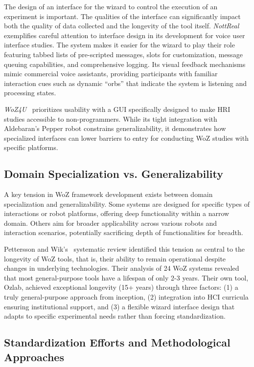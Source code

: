 \documentclass[letterpaper, 10 pt, conference]{subfiles/ieeeconf}
\begin{document}
The design of an interface for the wizard to control the execution of an experiment is important. The qualities of the interface can significantly impact both the quality of data collected and the longevity of the tool itself. \emph{NottReal}~\cite{Porcheron2020} exemplifies careful attention to interface design in its development for voice user interface studies. The system makes it easier for the wizard to play their role featuring tabbed lists of pre-scripted messages, slots for customization, message queuing capabilities, and comprehensive logging. Its visual feedback mechanisms mimic commercial voice assistants, providing participants with familiar interaction cues such as dynamic ``orbs'' that indicate the system is listening and processing states.

\emph{WoZ4U}~\cite{Rietz2021} prioritizes usability with a GUI specifically designed to make HRI studies accessible to non-programmers. While its tight integration with Aldebaran's Pepper robot constrains generalizability, it demonstrates how specialized interfaces can lower barriers to entry for conducting WoZ studies with specific platforms.

\subsection{Domain Specialization vs. Generalizability}

A key tension in WoZ framework development exists between domain specialization and generalizability. Some systems are designed for specific types of interactions or robot platforms, offering deep functionality within a narrow domain. Others aim for broader applicability across various robots and interaction scenarios, potentially sacrificing depth of functionalities for breadth.

Pettersson and Wik's~\cite{Pettersson2015} systematic review identified this tension as central to the longevity of WoZ tools, that is, their ability to remain operational despite changes in underlying technologies. Their analysis of 24 WoZ systems revealed that most general-purpose tools have a lifespan of only 2-3 years. Their own tool, Ozlab, achieved exceptional longevity (15+ years) through three factors: (1) a truly general-purpose approach from inception, (2) integration into HCI curricula ensuring institutional support, and (3) a flexible wizard interface design that adapts to specific experimental needs rather than forcing standardization.

\subsection{Standardization Efforts and Methodological Approaches}
\end{document}
